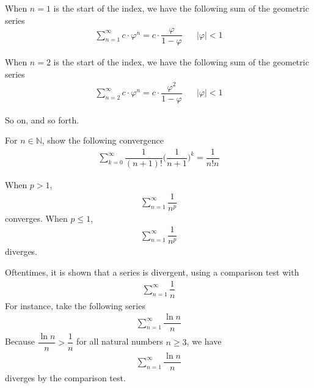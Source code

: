 \begin{note}
When $n=1$ is the start of the index, we have the following sum of the geometric series
\begin{align*}
    \sum_{n=1}^{\infty} c \cdot \varphi ^{n} = c \cdot \dfrac{\varphi}{1 - \varphi} \hspace{20pt} \lvert \varphi \rvert < 1 
\end{align*}

When $n=2$ is the start of the index, we have the following sum of the geometric series
\begin{align*}
    \sum_{n=2}^{\infty} c \cdot \varphi ^{n} = c \cdot \dfrac{\varphi ^{2}}{1 - \varphi} \hspace{20pt} \lvert \varphi \rvert < 1
\end{align*}

So on, and so forth.
\end{note}

\begin{exercise}
For $n \in \mathbb{N}$, show the following convergence
\begin{align*}
    \sum_{k=0}^{\infty} \dfrac{1}{(n+1)!} \Big(\dfrac{1}{n+1}\Big)^{k} = \dfrac{1}{n!n}
\end{align*}
\end{exercise}

\begin{theorem}
When $p > 1$, 
\begin{align*}
    \sum_{n = 1}^{\infty} \dfrac{1}{n^{p}}
\end{align*}
converges. When $p \leq 1$,
\begin{align*}
    \sum_{n = 1}^{\infty} \dfrac{1}{n^{p}}
\end{align*}
diverges.
\end{theorem}

\begin{example}
Oftentimes, it is shown that a series is divergent, using a comparison test with
\begin{align*}
    \sum_{n = 1}^{\infty} \dfrac{1}{n}
\end{align*}
For instance, take the following series
\begin{align*}
    \sum_{n = 1}^{\infty} \dfrac{\ln n}{n}
\end{align*}
Because $\dfrac{\ln n}{n} > \dfrac{1}{n}$ for all natural numbers $n \geq 3$, we have
\begin{align*}
    \sum_{n = 1}^{\infty} \dfrac{\ln n}{n} 
\end{align*}
diverges by the comparison test.
\end{example}

